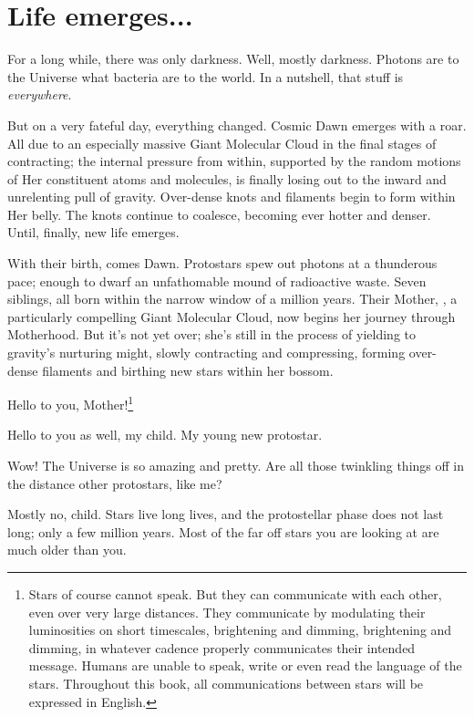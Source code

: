 \documentclass[main.tex]{subfiles}
\begin{document}
\chapter{Life emerges...}

\newpara \nar For a long while, there was only darkness.  Well, mostly darkness.  Photons are to the Universe what bacteria are to the world.  In a nutshell, that stuff is \textit{everywhere}.  

\newpara \nar But on a very fateful day, everything changed.  Cosmic Dawn emerges with a roar.  All due to an especially massive Giant Molecular Cloud in the final stages of contracting; the internal pressure from within, supported by the random motions of Her constituent atoms and molecules, is finally losing out to the inward and unrelenting pull of gravity.  Over-dense knots and filaments begin to form within Her belly.  The knots continue to coalesce, becoming ever hotter and denser. Until, finally, new life emerges.  

\newpara \nar With their birth, comes Dawn.  Protostars spew out photons at a thunderous pace; enough to dwarf an unfathomable mound of radioactive waste.  Seven siblings, all born within the narrow window of a million years. Their Mother, \rmpleione, a particularly compelling Giant Molecular Cloud, now begins her journey through Motherhood.  But it's not yet over; she's still in the process of yielding to gravity's nurturing might, slowly contracting and compressing, forming over-dense filaments and birthing new stars within her bossom.  

\newpara \Maia Hello to you, Mother!\footnote{Stars of course cannot speak.  But they can communicate with each other, even over very large distances.  They communicate by modulating their luminosities on short timescales, brightening and dimming, brightening and dimming, in whatever cadence properly communicates their intended message.  Humans are unable to speak, write or even read the language of the stars.  Throughout this book, all communications between stars will be expressed in English.} 

\newpara \Pleione Hello to you as well, my child.  My young new protostar.

\newpara \Maia Wow!  The Universe is so amazing and pretty.  Are all those twinkling things off in the distance other protostars, like me?

\newpara \Pleione Mostly no, child.  Stars live long lives, and the protostellar phase does not last long; only a few million years.  Most of the far off stars you are looking at are much older than you.
\end{document}
